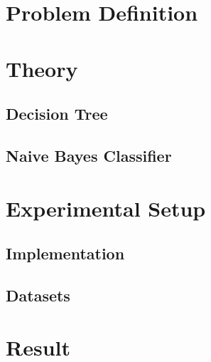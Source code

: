 \documentclass[12pt]{article}
\begin{document}
\maketitle
\thispagestyle{empty}
\clearpage
\newpage

\section{Problem Definition}



\section{Theory}
\subsection{Decision Tree}

\subsection{Naive Bayes Classifier}


\section{Experimental Setup}
\subsection{Implementation}


\subsection{Datasets}



\section{Result}
\end{document}
